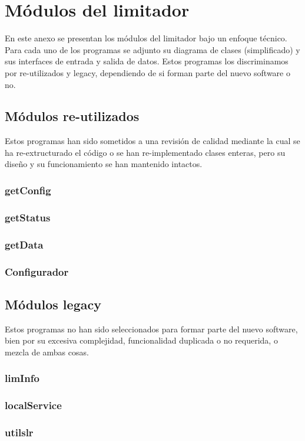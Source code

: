 \chapter{Módulos del limitador} \label{append:programas}

En este anexo se presentan los módulos del limitador bajo un enfoque técnico. Para cada uno de los programas se adjunto su diagrama de clases (simplificado) y sus interfaces de entrada y salida de datos. Estos programas los discriminamos por re-utilizados y legacy, dependiendo de si forman parte del nuevo software o no.

\section{Módulos re-utilizados}

Estos programas han sido sometidos a una revisión de calidad mediante la cual se ha re-extructurado el código o se han re-implementado clases enteras, pero su diseño y su funcionamiento se han mantenido intactos.

\subsection{getConfig} \label{append:getConfig}

\clearpage

\subsection{getStatus} \label{append:getStatus}

\clearpage

\subsection{getData} \label{append:getData}

\clearpage

\subsection{Configurador}

\clearpage

\section{Módulos legacy}

Estos programas no han sido seleccionados para formar parte del nuevo software, bien por su excesiva complejidad, funcionalidad duplicada o no requerida, o mezcla de ambas cosas.

\subsection{limInfo} \label{append:limInfo}

\clearpage

\subsection{localService} \label{append:localservice}

\clearpage

\subsection{utilslr} \label{append:utilslr}

\clearpage
